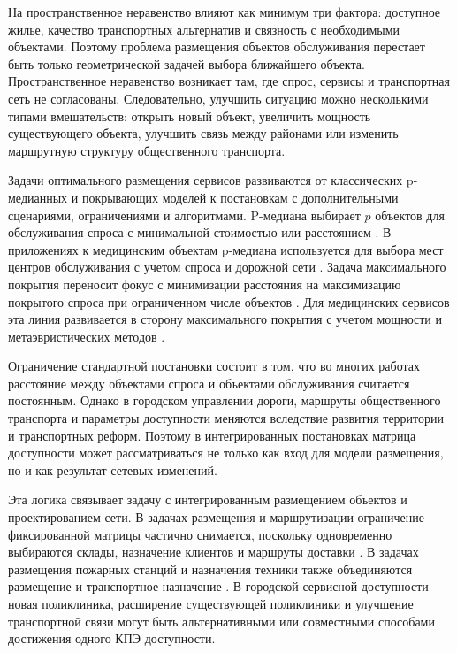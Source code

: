 На пространственное неравенство влияют как минимум три фактора: доступное жилье, качество транспортных альтернатив и связность с необходимыми объектами. Поэтому проблема размещения объектов обслуживания перестает быть только геометрической задачей выбора ближайшего объекта. Пространственное неравенство возникает там, где спрос, сервисы и транспортная сеть не согласованы. Следовательно, улучшить ситуацию можно несколькими типами вмешательств: открыть новый объект, увеличить мощность существующего объекта, улучшить связь между районами или изменить маршрутную структуру общественного транспорта.

Задачи оптимального размещения сервисов развиваются от классических p-медианных и покрывающих моделей к постановкам с дополнительными сценариями, ограничениями и алгоритмами. P-медиана выбирает \(p\) объектов для обслуживания спроса с минимальной стоимостью или расстоянием \cite{bernabe2021pMedian}. В приложениях к медицинским объектам p-медиана используется для выбора мест центров обслуживания с учетом спроса и дорожной сети \cite{murad2021healthCenters}. Задача максимального покрытия переносит фокус с минимизации расстояния на максимизацию покрытого спроса при ограниченном числе объектов \cite{maximo2023mclp}. Для медицинских сервисов эта линия развивается в сторону максимального покрытия с учетом мощности и метаэвристических методов \cite{elkady2016capacitatedMclp}.

Ограничение стандартной постановки состоит в том, что во многих работах расстояние между объектами спроса и объектами обслуживания считается постоянным. Однако в городском управлении дороги, маршруты общественного транспорта и параметры доступности меняются вследствие развития территории и транспортных реформ. Поэтому в интегрированных постановках матрица доступности может рассматриваться не только как вход для модели размещения, но и как результат сетевых изменений.

Эта логика связывает задачу с интегрированным размещением объектов и проектированием сети. В задачах размещения и маршрутизации ограничение фиксированной матрицы частично снимается, поскольку одновременно выбираются склады, назначение клиентов и маршруты доставки \cite{oudouar2020clrp}. В задачах размещения пожарных станций и назначения техники также объединяются размещение и транспортное назначение \cite{rodriguez2021fireFacility}. В городской сервисной доступности новая поликлиника, расширение существующей поликлиники и улучшение транспортной связи могут быть альтернативными или совместными способами достижения одного КПЭ доступности.

